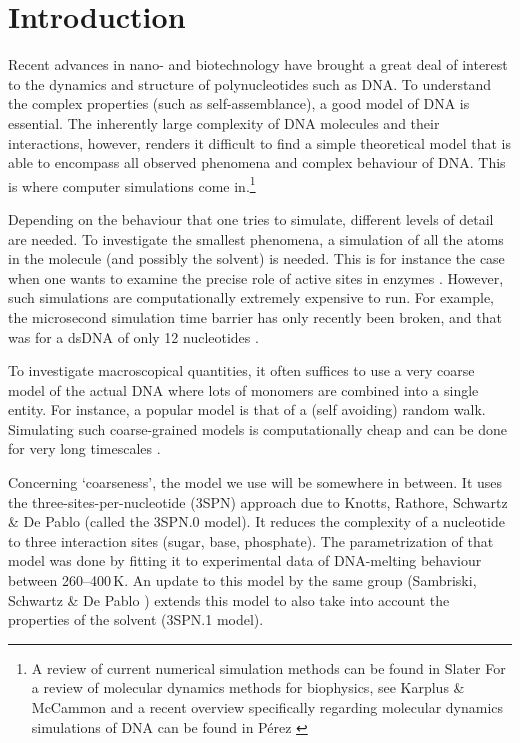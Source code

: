 \section{Introduction}


Recent advances in nano- and biotechnology have brought a great deal of interest to the dynamics and structure of polynucleotides such as DNA. To understand the complex properties (such as self-assemblance), a good model of DNA is essential. The inherently large complexity of DNA molecules and their interactions, however, renders it difficult to find a simple theoretical model that is able to encompass all observed phenomena and complex behaviour of DNA. This is where computer simulations come in.\footnote{A review of current numerical simulation methods can be found in Slater \etal \cite{slater2009modeling} For a review of molecular dynamics methods for biophysics, see Karplus \& McCammon \cite{karplus2002molecular} and a recent overview specifically regarding molecular dynamics simulations of DNA can be found in P\'erez \etal\cite{perez2011frontiers}}

Depending on the behaviour that one tries to simulate, different levels of detail are needed. To investigate the smallest phenomena, a simulation of all the atoms in the molecule (and possibly the solvent) is needed. This is for instance the case when one wants to examine the precise role of active sites in enzymes \cite{weiner1986all}.  However, such simulations are computationally extremely expensive to run. For example, the microsecond simulation time barrier has only recently been broken, and that was for a dsDNA of only 12 nucleotides \cite{perez2007dynamics}.

To investigate macroscopical quantities, it often suffices to use a very coarse model of the actual DNA where lots of monomers are combined into a single entity. For instance, a popular model is that of a (self avoiding) random walk. Simulating such coarse-grained models is computationally cheap and can be done for very long timescales \cite{elber2005long}.

Concerning `coarseness', the model we use will be somewhere in between. It uses the three-sites-per-nucleotide (3SPN) approach due to Knotts, Rathore, Schwartz \& De Pablo \cite{knotts2007coarse} (called the 3SPN.0 model). It reduces the complexity of a nucleotide to three interaction sites (sugar, base, phosphate). The parametrization of that model was done by fitting it to experimental data of DNA-melting behaviour between 260--400\,K. An update to this model by the same group (Sambriski, Schwartz \& De Pablo \cite{sambriski2009mesoscale}) extends this model to also take into account the properties of the solvent (3SPN.1 model).

